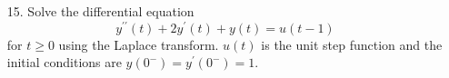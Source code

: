 \documentclass[main.tex]{subfiles}
\begin{document}
\begin{enumerate}
\begin{enumerate}
    \end{enumerate}
    
\item [15.] Solve the differential equation
    $$y^{\prime \prime}(t)+2 y^{\prime}(t)+y(t)=u(t-1)$$
for $t \geq 0$ using the Laplace transform. $u(t)$ is the unit step function and the initial conditions are $y\left(0^{-}\right)=y^{\prime}\left(0^{-}\right)=1$.

\end{enumerate}
\end{document}
